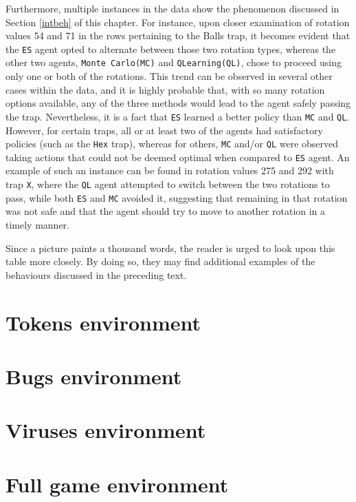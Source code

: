 Furthermore, multiple instances in the data show the phenomenon discussed in Section \ref{intbeh} of this chapter. For instance, upon closer examination of rotation values 54 and 71 in the rows pertaining to the Balls trap, it becomes evident that the \texttt{ES} agent opted to alternate between those two rotation types, whereas the other two agents, \texttt{Monte Carlo(MC)} and \texttt{QLearning(QL)}, chose to proceed using only one or both of the rotations. This trend can be observed in several other cases within the data, and it is highly probable that, with so many rotation options available, any of the three methods would lead to the agent safely passing the trap. Nevertheless, it is a fact that \texttt{ES} learned a better policy than \texttt{MC} and \texttt{QL}. However, for certain traps, all or at least two of the agents had satisfactory policies (such as the \texttt{Hex} trap), whereas for others, \texttt{MC} and/or \texttt{QL} were observed taking actions that could not be deemed optimal when compared to \texttt{ES} agent. An example of such an instance can be found in rotation values 275 and 292 with trap \texttt{X}, where the \texttt{QL} agent attempted to switch between the two rotations to pass, while both \texttt{ES} and \texttt{MC} avoided it, suggesting that remaining in that rotation was not safe and that the agent should try to move to another rotation in a timely manner.

Since a picture paints a thousand words, the reader is urged to look upon this table more closely. By doing so, they may find additional examples of the behaviours discussed in the preceding text. 

\section{Tokens environment}
\section{Bugs environment}
\section{Viruses environment}
\section{Full game environment}